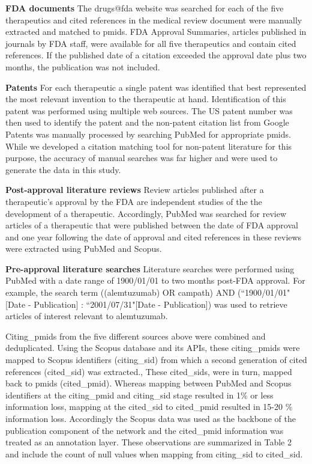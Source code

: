 \documentclass[10pt,letterpaper]{article}
\begin{document}
\textbf{FDA documents} The drugs@fda website\cite{bibFDA} was searched for each of the five therapeutics and cited references in the medical review document were manually extracted and matched to pmids. FDA Approval Summaries, articles published in journals by FDA staff, were available for all five therapeutics and contain cited references. If the published date of a citation exceeded the approval date plus two months, the publication was not included.

\textbf{Patents} For each therapeutic a single patent was identified that best represented the most relevant invention to the therapeutic at hand. Identification of this patent was performed using multiple web sources. The US patent number was then used to identify the patent and the non-patent citation list from Google Patents \cite{bibGooglePatents} was manually processed by searching PubMed for appropriate pmids. While we developed a citation matching tool for non-patent literature for this purpose, the accuracy of manual searches was far higher and were used to generate the data in this study.

\textbf{Post-approval literature reviews} Review articles published after a therapeutic's approval by the FDA are independent studies of the the development of a therapeutic. Accordingly, PubMed was searched for review articles of a therapeutic that were published between the date of FDA approval and one year following the date of approval and cited references in these reviews were extracted using PubMed and Scopus.

\textbf{Pre-approval literature searches} Literature searches were performed using PubMed with a date range of 1900/01/01 to two months post-FDA approval. For example, the search term ((alemtuzumab) OR campath) AND (``1900/01/01"[Date - Publication] : ``2001/07/31"[Date - Publication]) was used to retrieve articles of interest relevant to alemtuzumab.

Citing\_pmids from the five different sources above  were combined and deduplicated. Using the Scopus database and its APIs, these citing\_pmids were mapped to Scopus identifiers (citing\_sid) from which a second generation of cited references (cited\_sid) was extracted., These cited\_sids, were in turn, mapped back to pmids (cited\_pmid). Whereas mapping between PubMed and Scopus identifiers at the citing\_pmid and citing\_sid stage resulted in 1\% or less information loss, mapping at the cited\_sid to cited\_pmid resulted in 15-20 \% information loss. Accordingly the Scopus data  was used as the backbone of the publication component of the network and the cited\_pmid information was treated as an annotation layer.  These observations are summarized in Table 2 and include the count of null values when mapping from citing\_sid to cited\_sid.
\end{document}
